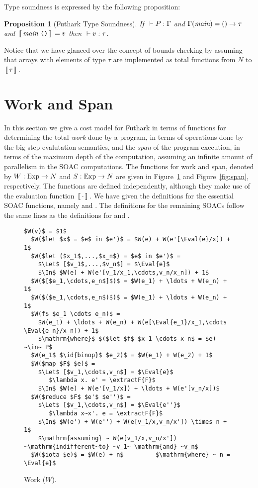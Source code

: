 \documentclass[oneside,11pt]{book}
\newtheorem{proposition}{Proposition}
\begin{document}
Type soundness is expressed by the following proposition:

\begin{proposition}[Futhark Type Soundness]
  If $~\vdash P : \Gamma$ and $\Gamma(\mbox{\it{main}}) = () \rightarrow \tau$ and
  $\,[\![\,\mbox{\it{main}}~\texttt{()}\,]\!]\, = v$ then $~\vdash v : \tau$.
\end{proposition}

Notice that we have glanced over the concept of bounds checking by
assuming that arrays with elements of type $\tau$ are implemented as
total functions from $N$ to $\,[\![\,\tau\,]\!]\,$.

\section{Work and Span}

In this section we give a cost model for Futhark in terms of functions
for determining the total \emph{work} done by a program, in terms of
operations done by the big-step evalutation semantics, and the
\emph{span} of the program execution, in terms of the maximum depth of
the computation, assuming an infinite amount of parallelism in the
SOAC computations. The functions for work and span, denoted by
$W : \mathrm{Exp} \rightarrow N$ and
$S : \mathrm{Exp} \rightarrow N$ are given in Figure~\ref{fig:work}
and Figure~\ref{fig:span}, respectively. The functions are defined
independently, although they make use of the evaluation function
$\,[\![\,\cdot\,]\!]\,$. We have given the definitions for the essential SOAC
functions, namely  and . The definitions for the
remaining SOACs follow the same lines as the definitions for 
and .

\begin{figure}
\begin{lstlisting}[mathescape=true,style=nonumbers]
  $W(v)$ = $1$
  $W($let $x$ = $e$ in $e')$ = $W(e) + W(e'[\Eval{e}/x]) + 1$
  $W($let ($x_1$,...,$x_n$) = $e$ in $e')$ =
    $\Let$ [$v_1$,...,$v_n$] = $\Eval{e}$
    $\In$ $W(e) + W(e'[v_1/x_1,\cdots,v_n/x_n]) + 1$
  $W($[$e_1,\cdots,e_n$]$)$ = $W(e_1) + \ldots + W(e_n) + 1$
  $W($($e_1,\cdots,e_n$)$)$ = $W(e_1) + \ldots + W(e_n) + 1$
  $W(f$ $e_1 \cdots e_n)$ =
    $W(e_1) + \ldots + W(e_n) + W(e[\Eval{e_1}/x_1,\cdots \Eval{e_n}/x_n]) + 1$
    $\mathrm{where}$ $($let $f$ $x_1 \cdots x_n$ = $e) ~\in~ P$
  $W(e_1$ $\id{binop}$ $e_2)$ = $W(e_1) + W(e_2) + 1$
  $W($map $F$ $e)$ =
    $\Let$ [$v_1,\cdots,v_n$] = $\Eval{e}$
       $\lambda x. e' = \extractF{F}$
    $\In$ $W(e) + W(e'[v_1/x]) + \ldots + W(e'[v_n/x])$
  $W($reduce $F$ $e'$ $e'')$ =
    $\Let$ [$v_1,\cdots,v_n$] = $\Eval{e''}$
       $\lambda x~x'. e = \extractF{F}$
    $\In$ $W(e') + W(e'') + W(e[v_1/x,v_n/x']) \times n + 1$
    $\mathrm{assuming} ~ W(e[v_1/x,v_n/x']) ~\mathrm{indifferent~to} ~v_1~ \mathrm{and} ~v_n$
  $W($iota $e)$ = $W(e) + n$         $\mathrm{where} ~ n = \Eval{e}$
\end{lstlisting}

\caption{Work ($W$).}
\label{fig:work}
\end{figure}
\end{document}
